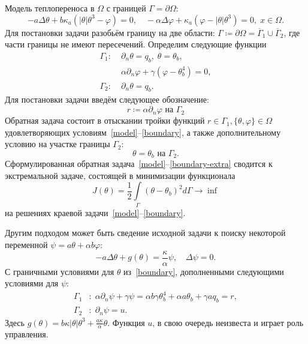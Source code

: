 Модель теплопереноса в $\Omega$ с границей $\Gamma = \partial \Omega$:
\begin{equation}
    \label{model}
    - a \Delta\theta + b\kappa_a(|\theta|\theta^3- \varphi)=0,   \quad
    - \alpha \Delta \varphi + \kappa_a(\varphi-|\theta|\theta^3)=0,\; x\in\Omega.
\end{equation}
Для постановки задачи разобьём границу на две области:
$\Gamma \coloneqq \partial \Omega =\overline{\Gamma}_1 \cup \overline{\Gamma}_2$,
где части границы не имеют пересечений.
Определим следующие функции
\begin{equation}
    \label{boundary}
    \begin{aligned}
        \Gamma_1 :\; &\partial_n \theta = q_b,\; \theta = \theta_b, \\
        &\alpha\partial_n\varphi + \gamma (\varphi - \theta_b ^4 ) = 0, \\
        \Gamma_2 :\; & \partial_n \theta = q_b.
    \end{aligned}
\end{equation}
Для постановки задачи введём следующее обозначение:
\[
    r \coloneqq \alpha \partial_n \varphi \text{ на }\Gamma_2
\]
Обратная задача состоит в отыскании тройки функций $r \in  \Gamma_1, \{\theta, \varphi\} \in \Omega $
удовлетворяющих условиям~\eqref{model}--\eqref{boundary}, а также дополнительному условию
на участке границы $\Gamma_2$:
\begin{equation}
    \label{boundary-extra}
    \theta = \theta_b \text{ на } \Gamma_2.
\end{equation}
Сформулированная обратная задача~\eqref{model}--\eqref{boundary-extra} сводится к экстремальной задаче,
состоящей в минимизации функционала
\begin{equation}
    \label{cost}
    J(\theta) = \frac{1}{2}\int\limits_\Gamma (\theta - \theta_b)^{2} d\Gamma \rightarrow \inf
\end{equation}
на решениях краевой задачи~\eqref{model}--\eqref{boundary}.


Другим подходом может быть сведение исходной задачи к поиску некоторой
переменной $\psi = a\theta + \alpha b \varphi$:
\begin{equation}
    \label{eq:equation}
    -a \Delta \theta + g (\theta) = \frac{\kappa}{\alpha}\psi, \quad
    \Delta \psi = 0.
\end{equation}
С граничными условиями для $\theta$ из~\eqref{boundary}, дополненными следующими условиями для
$\psi$:
\begin{equation}
    \label{eq:boundary-2}
    \begin{aligned}
        \Gamma_1 &: \; \alpha \partial_n \psi + \gamma \psi = \alpha b \gamma \theta_b^4 + \alpha a \theta_b + \gamma a q_b = r, \\
        \Gamma_2 &: \; \partial_n \psi = u.
    \end{aligned}
\end{equation}
Здесь $g(\theta) = b \kappa|\theta|\theta^3 + \frac{a\kappa}{\alpha}\theta$.
Функция $u$, в свою очередь неизвеста и играет роль управления.
